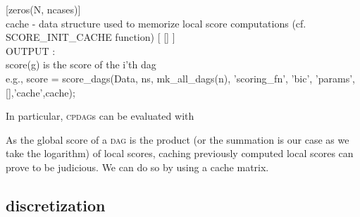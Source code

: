 {  \hspace*{40pt}[zeros(N, ncases)]\\
\hspace*{20pt}cache       - data structure used to memorize local score computations
  \hspace*{40pt}(cf. SCORE\_INIT\_CACHE function) [ [] ]\vspace*{0.5\baselineskip}\\
OUTPUT :\\
\hspace*{20pt}score(g) is the score of the i'th dag\vspace*{0.5\baselineskip}\\
e.g., score = score\_dags(Data, ns, mk\_all\_dags(n), 'scoring\_fn', 'bic',
  \hspace*{40pt}'params', [],'cache',cache);
}
\vspace{.75\baselineskip}

\noindent In particular, \textsc{cpdag}s can be evaluated with
\vspace{-1.25\baselineskip}

\vspace{.5\baselineskip}

As the global score of a \textsc{dag} is the product (or the summation is our case as we take the logarithm) of local scores, 
caching previously computed local scores can prove to be judicious.
We can do so by using a cache matrix.
\vspace{-1.5\baselineskip}

\vspace{-.5\baselineskip}

\subsection{discretization}

